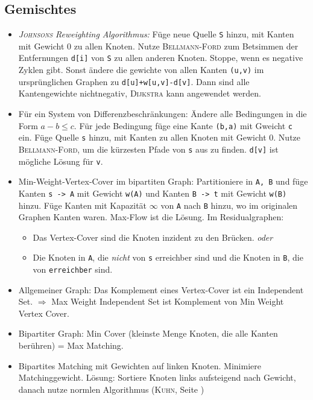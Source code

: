 \subsection{Gemischtes}
\begin{itemize}[itemsep=5mm]
	\item \emph{\textsc{Johnsons} Reweighting Algorithmus:} Füge neue Quelle \lstinline{S} hinzu, mit Kanten mit Gewicht 0 zu allen Knoten. Nutze \textsc{Bellmann-Ford} zum Betsimmen der Entfernungen \lstinline{d[i]} von \lstinline{S} zu allen anderen Knoten. Stoppe, wenn es negative Zyklen gibt. Sonst ändere die gewichte von allen Kanten \lstinline{(u,v)} im ursprünglichen Graphen zu \lstinline{d[u]+w[u,v]-d[v]}. Dann sind alle Kantengewichte nichtnegativ, \textsc{Dijkstra} kann angewendet werden.
	\item Für ein System von Differenzbeschränkungen: Ändere alle Bedingungen in die Form $a-b \leq c$. Für jede Bedingung füge eine Kante \lstinline{(b,a)} mit Gweicht \lstinline{c} ein. Füge Quelle \lstinline{s} hinzu, mit Kanten zu allen Knoten mit Gewicht 0. Nutze \textsc{Bellmann-Ford}, um die kürzesten Pfade von \lstinline{s} aus zu finden. \lstinline{d[v]} ist mögliche Lösung für \lstinline{v}.
	\item Min-Weight-Vertex-Cover im bipartiten Graph: Partitioniere in \lstinline{A, B} und füge Kanten \lstinline{s -> A} mit Gewicht \lstinline{w(A)} und Kanten  \lstinline{B -> t} mit Gewicht \lstinline{w(B)} hinzu. Füge Kanten mit Kapazität $\infty$ von \lstinline{A} nach \lstinline{B} hinzu, wo im originalen Graphen Kanten waren. Max-Flow ist die Lösung.\newline
	Im Residualgraphen:
	\begin{itemize}
		\item Das Vertex-Cover sind die Knoten inzident zu den Brücken. \emph{oder}
		\item Die Knoten in \lstinline{A}, die \emph{nicht} von \lstinline{s} erreichber sind und die Knoten in \lstinline{B}, die von \lstinline{erreichber} sind.
	\end{itemize}
	\item Allgemeiner Graph: Das Komplement eines Vertex-Cover ist ein Independent Set. $\Rightarrow$ Max Weight Independent Set ist Komplement von Min Weight Vertex Cover.
	\item Bipartiter Graph: Min Cover (kleinste Menge Knoten, die alle Kanten berühren) = Max Matching.
	\item Bipartites Matching mit Gewichten auf linken Knoten. Minimiere Matchinggewicht. Lösung: Sortiere Knoten links aufsteigend nach Gewicht, danach nutze normlen Algorithmus (\textsc{Kuhn}, Seite \pageref{kuhn})
\end{itemize}
